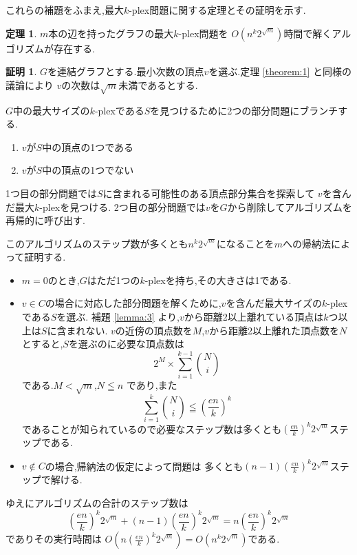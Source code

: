 \documentclass{thesis}
\theoremstyle{definition}
\newtheorem{theorem}{定理}[chapter]
\newtheorem*{prf*}{証明}
\begin{document}
これらの補題をふまえ,最大$k$-plex問題に関する定理とその証明を示す.
\begin{theorem} \label{theorem:3}
$m$本の辺を持ったグラフの最大$k$-plex問題を
$O(n^{k}2^{\sqrt{m}})$時間で解くアルゴリズムが存在する.
\begin{prf*}
$G$を連結グラフとする.最小次数の頂点$v$を選ぶ.定理 \ref{theorem:1} と同様の議論により
$v$の次数は$\sqrt{m}$未満であるとする.

$G$中の最大サイズの$k$-plexである$S$を見つけるために2つの部分問題にブランチする.
\begin{enumerate}
 \item $v$が$S$中の頂点の1つである
 \item $v$が$S$中の頂点の1つでない
\end{enumerate}
1つ目の部分問題では$S$に含まれる可能性のある頂点部分集合を探索して
$v$を含んだ最大$k$-plexを見つける.
2つ目の部分問題では$v$を$G$から削除してアルゴリズムを再帰的に呼び出す.

このアルゴリズムのステップ数が多くとも$n^{k}2^{\sqrt{m}}$になることを$m$への帰納法によって証明する.
\begin{itemize}
 \item $m = 0$のとき,$G$はただ1つの$k$-plexを持ち,その大きさは1である.	
 \item $v \in C$の場合に対応した部分問題を解くために,$v$を含んだ最大サイズの$k$-plexである$S$を選ぶ.
補題  \ref{lemma:3} より,$v$から距離2以上離れている頂点は$k$つ以上は$S$に含まれない.
$v$の近傍の頂点数を$M$,$v$から距離2以上離れた頂点数を$N$とすると,$S$を選ぶのに必要な頂点数は
\[ 2^{M} \times  \sum_{i = 1}^{k - 1}\binom{N}{i}  \]
である.$M < \sqrt{m}$,$N \leqq n$ であり,また
\[ \sum_{i = 1}^{k}\binom{N}{i}  \leqq {\left( \frac{en}{k} \right)}^{k} \]
であることが知られているので必要なステップ数は多くとも${\left( \frac{en}{k} \right)}^{k}2^{\sqrt{m}}$ステップである.
 \item $v \notin C$の場合,帰納法の仮定によって問題は
多くとも$(n - 1){\left( \frac{en}{k} \right)}^{k}2^{\sqrt{m}}$ステップで解ける.
\end{itemize}
ゆえにアルゴリズムの合計のステップ数は
\[  {\left( \frac{en}{k} \right)}^{k}2^{\sqrt{m}} +  (n - 1){\left( \frac{en}{k} \right)}^{k}2^{\sqrt{m}} =n{\left( \frac{en}{k} \right)}^{k}2^{\sqrt{m}} \]
でありその実行時間は $O(n{\left( \frac{en}{k} \right)}^{k}2^{\sqrt{m}}) = O(n^{k}2^{\sqrt{m}})$である.
\end{prf*}
\end{theorem}

\newpage
\end{document}
